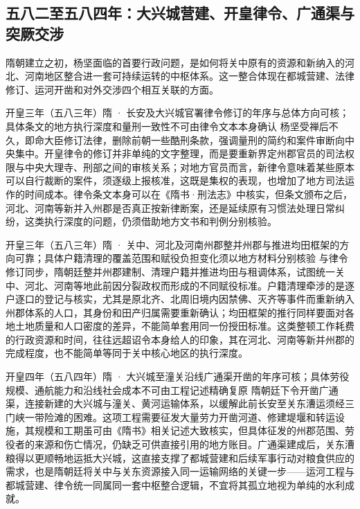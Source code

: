 \subsection{五八二至五八四年：大兴城营建、开皇律令、广通渠与突厥交涉}

隋朝建立之初，杨坚面临的首要行政问题，是如何将关中原有的资源和新纳入的河北、河南地区整合进一套可持续运转的中枢体系。这一整合体现在都城营建、法律修订、运河开凿和对外交涉四个相互关联的方面。

\begin{event}{}{开皇三年（五八三年）}{隋 · 长安及大兴城官署}{律令修订的年序与总体方向可核；具体条文的地方执行深度和量刑一致性不可由律令文本本身确认}
杨坚受禅后不久，即命大臣修订法律，删除前朝一些酷刑条款，强调量刑的简约和案件审断向中央集中。开皇律令的修订并非单纯的文字整理，而是要重新界定州郡官员的司法权限与中央大理寺、刑部之间的审核关系；对地方官员而言，新律令意味着某些原本可以自行裁断的案件，须逐级上报核准，这既是集权的表现，也增加了地方司法运作的时间成本。律令条文本身可以在《隋书·刑法志》中核实，但条文颁布之后，河北、河南等新并入州郡是否真正按新律断案，还是延续原有习惯法处理日常纠纷，这类执行深度的问题，仍须借助地方文书和判例分别核验。
\end{event}

\begin{event}{}{开皇三年（五八三年）}{隋 · 关中、河北及河南州郡}{整并州郡与推进均田框架的方向可靠；具体户籍清理的覆盖范围和赋役负担变化须以地方材料分别核验}
与律令修订同步，隋朝廷整并州郡建制、清理户籍并推进均田与租调体系，试图统一关中、河北、河南等地此前因分裂政权而形成的不同赋役标准。户籍清理牵涉的是逐户逐口的登记与核实，尤其是原北齐、北周旧境内因禁佛、灭齐等事件而重新纳入州郡体系的人口，其身份和田产归属需要重新确认；均田框架的推行同样要面对各地土地质量和人口密度的差异，不能简单套用同一份授田标准。这类整顿工作耗费的行政资源和时间，往往远超诏令本身给人的印象，其在河北、河南等新并州郡的完成程度，也不能简单等同于关中核心地区的执行深度。
\end{event}

\begin{event}{}{开皇四年（五八四年）}{隋 · 大兴城至潼关沿线}{广通渠开凿的年序可核；具体劳役规模、通航能力和沿线社会成本不可由工程记述精确复原}
隋朝廷下令开凿广通渠，连接新建的大兴城与潼关、黄河运输体系，以缓解此前长安至关东漕运须经三门峡一带险滩的困难。这项工程需要征发大量劳力开凿河道、修建堤堰和转运设施，其规模和工期虽可由《隋书》相关记述大致核实，但具体征发的州郡范围、劳役者的来源和伤亡情况，仍缺乏可供直接引用的地方账目。广通渠建成后，关东漕粮得以更顺畅地运抵大兴城，这直接支撑了都城营建和后续军事行动对粮食供应的需求，也是隋朝廷将关中与关东资源接入同一运输网络的关键一步——运河工程与都城营建、律令统一同属同一套中枢整合逻辑，不宜将其孤立地视为单纯的水利成就。
\end{event}

